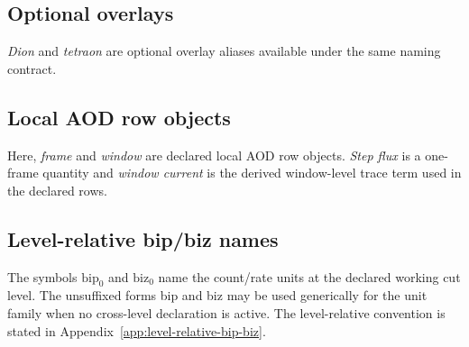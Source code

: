 \subsection{Optional overlays}
\emph{Dion} and \emph{tetraon} are optional overlay aliases available under the same naming contract.

\subsection{Local AOD row objects}
Here, \emph{frame} and \emph{window} are declared local AOD row objects. \emph{Step flux} is a one-frame quantity and \emph{window current} is the derived window-level trace term used in the declared rows.

\subsection{Level-relative bip/biz names}
The symbols \(\mathrm{bip}_0\) and \(\mathrm{biz}_0\) name the count/rate units at the declared working cut level. The unsuffixed forms bip and biz may be used generically for the unit family when no cross-level declaration is active. The level-relative convention is stated in Appendix~\ref{app:level-relative-bip-biz}.
